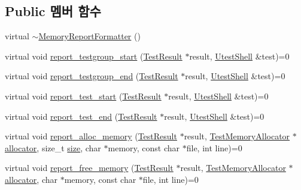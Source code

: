 \subsection*{Public 멤버 함수}
\begin{DoxyCompactItemize}
\item 
virtual \hyperlink{class_memory_report_formatter_ac4740cb80f080ff622748c92f123215f}{$\sim$\+Memory\+Report\+Formatter} ()
\item 
virtual void \hyperlink{class_memory_report_formatter_a8f75294451f71b616932a7a9c649caa0}{report\+\_\+testgroup\+\_\+start} (\hyperlink{class_test_result}{Test\+Result} $\ast$result, \hyperlink{class_utest_shell}{Utest\+Shell} \&test)=0
\item 
virtual void \hyperlink{class_memory_report_formatter_aa6b20dc53db478226037eaac7ae7b49e}{report\+\_\+testgroup\+\_\+end} (\hyperlink{class_test_result}{Test\+Result} $\ast$result, \hyperlink{class_utest_shell}{Utest\+Shell} \&test)=0
\item 
virtual void \hyperlink{class_memory_report_formatter_a3e3c7a63454b6711cf890eddcaba0d6a}{report\+\_\+test\+\_\+start} (\hyperlink{class_test_result}{Test\+Result} $\ast$result, \hyperlink{class_utest_shell}{Utest\+Shell} \&test)=0
\item 
virtual void \hyperlink{class_memory_report_formatter_ace6fc7f4a7c7cb5d702018d91d85ae62}{report\+\_\+test\+\_\+end} (\hyperlink{class_test_result}{Test\+Result} $\ast$result, \hyperlink{class_utest_shell}{Utest\+Shell} \&test)=0
\item 
virtual void \hyperlink{class_memory_report_formatter_a27f55ca9a929b13376410b3369450fb3}{report\+\_\+alloc\+\_\+memory} (\hyperlink{class_test_result}{Test\+Result} $\ast$result, \hyperlink{class_test_memory_allocator}{Test\+Memory\+Allocator} $\ast$\hyperlink{_memory_leak_warning_test_8cpp_a83fc2e9b9142613f7df2bcc3ff8292bc}{allocator}, size\+\_\+t \hyperlink{gst__avb__playbin_8c_a439227feff9d7f55384e8780cfc2eb82}{size}, char $\ast$memory, const char $\ast$file, int line)=0
\item 
virtual void \hyperlink{class_memory_report_formatter_a57360da7f89ad25456d061955c7c77da}{report\+\_\+free\+\_\+memory} (\hyperlink{class_test_result}{Test\+Result} $\ast$result, \hyperlink{class_test_memory_allocator}{Test\+Memory\+Allocator} $\ast$\hyperlink{_memory_leak_warning_test_8cpp_a83fc2e9b9142613f7df2bcc3ff8292bc}{allocator}, char $\ast$memory, const char $\ast$file, int line)=0
\end{DoxyCompactItemize}


